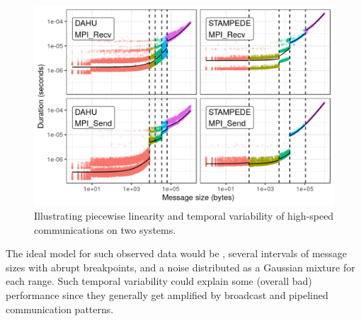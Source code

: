             \begin{figure}[ht]
                \vspace{-1em}
                \centering \includegraphics[width=.9\linewidth]{./img/prediction/modeling/network/mpi_calibration.png}
                \caption{Illustrating piecewise linearity and temporal variability of high-speed communications on two
                systems.}
                \label{fig:nw_var}
            \end{figure}

            The ideal model for such observed data would be , several intervals of message sizes
            with abrupt breakpoints, and a noise distributed as a Gaussian mixture for each range.  Such temporal
            variability could explain some (overall bad) performance since they generally get amplified by broadcast and
            pipelined communication patterns.

